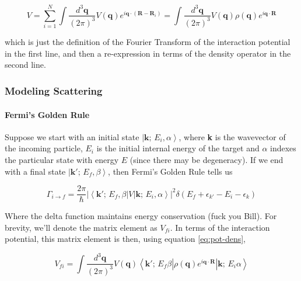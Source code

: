 \documentclass{article}
\begin{document}
			\begin{equation} \label{eq:pot-dens}
			V=\sum_{i=1}^N \int\frac{d^3\mathbf{q}}{(2\pi)^3}V(\mathbf{q})e^{i\mathbf{q}\cdot(\mathbf{R}-\mathbf{R}_i)}=\int\frac{d^3\mathbf{q}}{(2\pi)^3}V(\mathbf{q}) \rho(\mathbf{q})e^{i\mathbf{q}\cdot\mathbf{R}}
			\end{equation}
			
			which is just the definition of the Fourier Transform of the interaction potential in the first line, and then a re-expression in terms of the density operator in the second line.
			
			\subsubsection{Modeling Scattering}
			
			
			\paragraph{Fermi's Golden Rule} Suppose we start with an initial state $\left|\mathbf{k};\,E_i,\alpha\right>$, where \textbf{k} is the wavevector of the incoming particle, $E_{i}$ is the initial internal energy of the target and $\alpha$ indexes the particular state with energy $E$ (since there may be degeneracy). If we end with a final state $\left|\mathbf{k}';\,E_f,\beta\right>$, then Fermi's Golden Rule tells us
			
			
			$$\Gamma_{i\to f}=\frac{2\pi}{\hbar}\left|\left<\mathbf{k}';\,E_f,\beta\right|V\left|\mathbf{k};\,E_i,\alpha\right>\right|^2\delta(E_f+\epsilon_{k'}-E_i-\epsilon_k)$$
			
			
			Where the delta function maintains energy conservation (fuck you Bill). For brevity, we'll denote the matrix element as $V_{fi}$. In terms of the interaction potential, this matrix element is then, using equation \ref{eq:pot-dens},
			
			\begin{equation} \label{eq:matrix}
			V_{fi}=\int\frac{d^3\mathbf{q}}{(2\pi)^3}V(\mathbf{q})\left<\mathbf{k}';\,E_f\beta\left|\rho(\mathbf{q})e^{i\mathbf{q}\cdot \mathbf{R}}\right|\mathbf{k};\,E_i\alpha\right>
			\end{equation}
			
\end{document}
